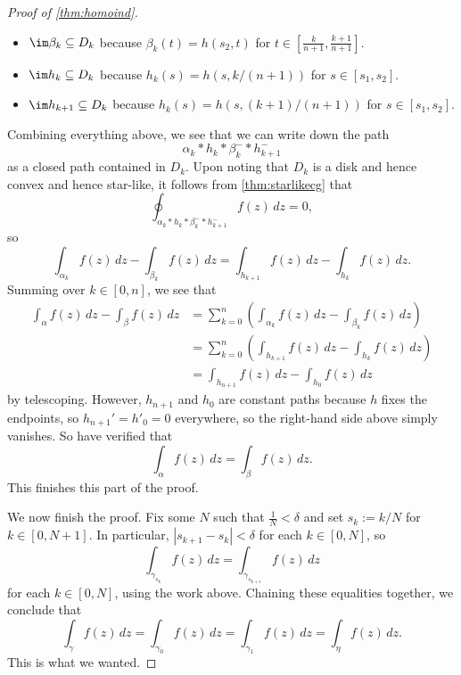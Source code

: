 \begin{proof}[Proof of \autoref{thm:homoind}]
\begin{itemize}
		\item $\im\beta_k\subseteq D_k$ because $\beta_k(t)=h(s_2,t)$ for $t\in\left[\frac k{n+1},\frac{k+1}{n+1}\right]$.
		\item $\im h_k\subseteq D_k$ because $h_k(s)=h(s,k/(n+1))$ for $s\in[s_1,s_2]$.
		\item $\im h_{k+1}\subseteq D_k$ because $h_k(s)=h(s,(k+1)/(n+1))$ for $s\in[s_1,s_2]$.
	\end{itemize}
	Combining everything above, we see that we can write down the path
	\[\alpha_k*h_k*\beta_k^-*h_{k+1}^-\]
	as a closed path contained in $D_k$. Upon noting that $D_k$ is a disk and hence convex and hence star-like, it follows from \autoref{thm:starlikecg} that
	\[\oint_{\alpha_k*h_k*\beta_k^-*h_{k+1}^-}f(z)\,dz=0,\]
	so
	\[\int_{\alpha_k}f(z)\,dz-\int_{\beta_k}f(z)\,dz=\int_{h_{k+1}}f(z)\,dz-\int_{h_k}f(z)\,dz.\]
	Summing over $k\in[0,n]$, we see that
	\begin{align*}
		\int_\alpha f(z)\,dz-\int_\beta f(z)\,dz &= \sum_{k=0}^n\left(\int_{\alpha_k}f(z)\,dz-\int_{\beta_k}f(z)\,dz\right) \\
		&= \sum_{k=0}^n\left(\int_{h_{k+1}}f(z)\,dz-\int_{h_k}f(z)\,dz\right) \\
		&= \int_{h_{n+1}}f(z)\,dz-\int_{h_0}f(z)\,dz
	\end{align*}
	by telescoping. However, $h_{n+1}$ and $h_0$ are constant paths because $h$ fixes the endpoints, so $h_{n+1}'=h'_0=0$ everywhere, so the right-hand side above simply vanishes. So have verified that
	\[\int_\alpha f(z)\,dz=\int_\beta f(z)\,dz.\]
	This finishes this part of the proof.

	We now finish the proof. Fix some $N$ such that $\frac1N<\delta$ and set $s_k:=k/N$ for $k\in[0,N+1]$. In particular, $|s_{k+1}-s_k|<\delta$ for each $k\in[0,N]$, so
	\[\int_{\gamma_{s_k}}f(z)\,dz=\int_{\gamma_{s_{k+1}}}f(z)\,dz\]
	for each $k\in[0,N]$, using the work above. Chaining these equalities together, we conclude that
	\[\int_\gamma f(z)\,dz=\int_{\gamma_0}f(z)\,dz=\int_{\gamma_1}f(z)\,dz=\int_\eta f(z)\,dz.\]
	This is what we wanted.
\end{proof}